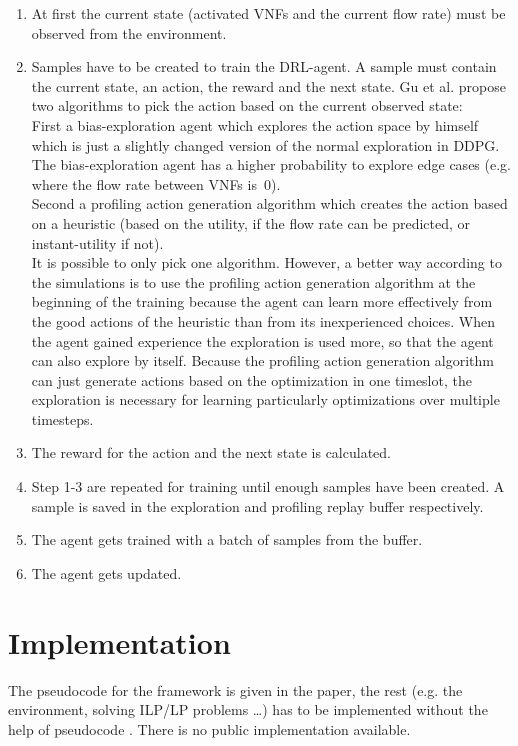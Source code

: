 \begin{enumerate}
\item At first the current state (activated VNFs and the current flow rate) must be observed from the environment.
\item Samples have to be created to train the DRL-agent. A sample must contain the current state, an action, the reward and the next state. Gu et al. \cite {Gu} propose two algorithms to pick the action based on the current observed state: \\
First a bias-exploration agent which explores the action space by himself which is just a slightly changed version of the normal exploration in DDPG. The bias-exploration agent has a higher probability to explore edge cases (e.g. where the flow rate between VNFs is~0). \\
Second a profiling action generation algorithm which creates the action based on a heuristic (based on the utility, if the flow rate can be predicted, or instant-utility if not). \\
It is possible to only pick one algorithm. However, a better way according to the simulations is to use the profiling action generation algorithm at the beginning of the training because the agent can learn more effectively from the good actions of the heuristic than from its inexperienced choices. When the agent gained experience the exploration is used more, so that the agent can also explore by itself. Because the profiling action generation algorithm can just generate actions based on the optimization in one timeslot, the exploration is necessary for learning  particularly optimizations over multiple timesteps.
\item  The reward for the action and the next state is calculated.
\item Step 1-3 are repeated for training until enough samples have been created. A sample is saved in the exploration and profiling replay buffer respectively.
\item The agent gets trained with a batch of samples from the buffer.
\item The agent gets updated.
\end{enumerate}

\section {Implementation}
The pseudocode for the framework is given in the paper, the rest (e.g. the environment, solving ILP/LP problems \dots) has to be implemented without the help of pseudocode \cite{Gu}. There is no public implementation available.


